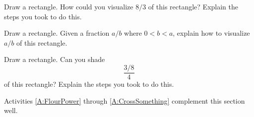 \begin{question}
Draw a rectangle. How could you visualize $8/3$ of this rectangle?
Explain the steps you took to do this.
\end{question}
\QM


\begin{question}
Draw a rectangle. Given a fraction $a/b$ where $0< b< a$, explain how
to visualize $a/b$ of this rectangle.
\end{question}
\QM

\begin{question}
Draw a rectangle.  Can you shade
\[
\frac{3/8}{4}
\]
of this rectangle? Explain the steps you took to do this.
\end{question}
\QM


\begin{activitynote}
Activities \ref{A:FlourPower} through \ref{A:CrossSomething} complement this section well. 
\end{activitynote}


\newpage

